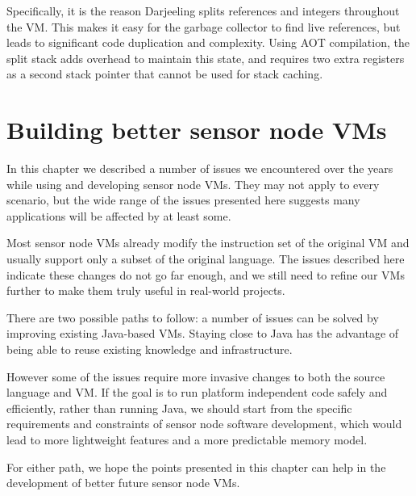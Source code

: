 Specifically, it is the reason Darjeeling splits references and integers throughout the VM. This makes it easy for the garbage collector to find live references, but leads to significant code duplication and complexity. Using AOT compilation, the split stack adds overhead to maintain this state, and requires two extra registers as a second stack pointer that cannot be used for stack caching.




\section{Building better sensor node VMs}
In this chapter we described a number of issues we encountered over the years while using and developing sensor node VMs. They may not apply to every scenario, but the wide range of the issues presented here suggests many applications will be affected by at least some.

Most sensor node VMs already modify the instruction set of the original VM and usually support only a subset of the original language. The issues described here indicate these changes do not go far enough, and we still need to refine our VMs further to make them truly useful in real-world projects.

There are two possible paths to follow: a number of issues can be solved by improving existing Java-based VMs. Staying close to Java has the advantage of being able to reuse existing knowledge and infrastructure.

However some of the issues require more invasive changes to both the source language and VM. If the goal is to run platform independent code safely and efficiently, rather than running Java, we should start from the specific requirements and constraints of sensor node software development, which would lead to more lightweight features and a more predictable memory model.

For either path, we hope the points presented in this chapter can help in the development of better future sensor node VMs.
